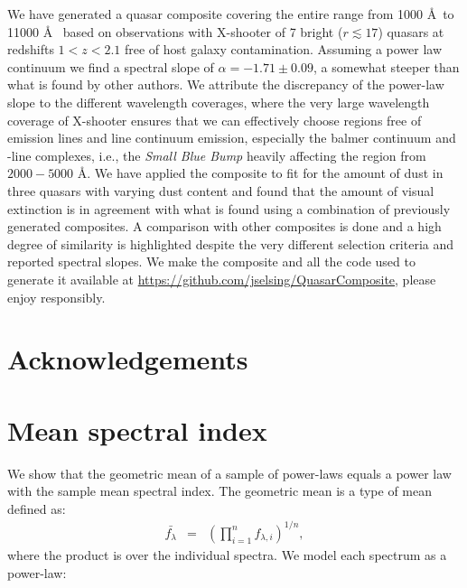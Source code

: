 \documentclass{aa}    %
\newcommand{\eqlabel}[1]{\label{eq:#1}}
\newcommand{\sectlabel}[1]{\label{sect:#1}}
\newcommand{\feii}{\ion{Fe}{ii}}
\begin{document}
{We have generated a quasar composite covering the entire range from 1000 \AA~to 11000 \AA~ based on observations with X-shooter of 7 bright ($r \lesssim 17$) quasars at redshifts $1 < z < 2.1$ free of host galaxy contamination. Assuming a power law continuum we find a spectral slope of $\alpha = -1.71 \pm 0.09$, a somewhat steeper than what is found by other authors. We attribute the discrepancy of the power-law slope to the different wavelength coverages, where the very large wavelength coverage of X-shooter ensures that we can effectively choose regions free of emission lines and line continuum emission, especially the balmer continuum and \feii-line complexes, i.e., the \textit{Small Blue Bump} heavily affecting the region from $2000 - 5000$ \AA. We have applied the composite to fit for the amount of dust in three quasars with varying dust content and found that the amount of visual extinction is in agreement with what is found using a combination of previously generated composites. A comparison with other composites is done and a high degree of similarity is highlighted despite the very different selection criteria and reported spectral slopes. We make the composite and all the code used to generate it available at \url{https://github.com/jselsing/QuasarComposite}, please enjoy responsibly.



\section{Acknowledgements}  \sectlabel{Acknowledgements}







 





\appendix

\section{Mean spectral index}  \sectlabel{math} \label{math}


We show that the geometric mean of a sample of power-laws equals a power law with the sample mean spectral index. The geometric mean is a type of mean defined as:
\begin{eqnarray}\eqlabel{geometric mean}
\bar{f_{\lambda}} &=&  \left( \prod_{i=1}^n f_{\lambda, i} \right) ^{1/n},
\end{eqnarray}
where the product is over the individual spectra. We model each spectrum as a power-law:

}
\end{document}
